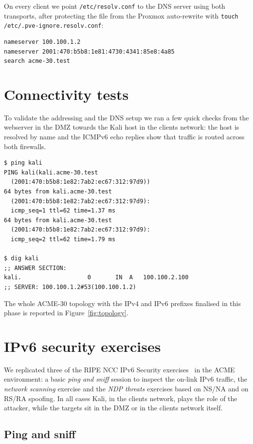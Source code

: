 \documentclass[twocolumn]{NobArticle}
\begin{document}
On every client we point \texttt{/etc/resolv.conf} to the DNS server using
both transports, after protecting the file from the Proxmox auto-rewrite
with \texttt{touch /etc/.pve-ignore.resolv.conf}:

\begin{lstlisting}
nameserver 100.100.1.2
nameserver 2001:470:b5b8:1e81:4730:4341:85e8:4a85
search acme-30.test
\end{lstlisting}

\section{Connectivity tests}

To validate the addressing and the DNS setup we ran a few quick checks from
the webserver in the DMZ towards the Kali host in the clients network: the
host is resolved by name and the ICMPv6 echo replies show that traffic is
routed across both firewalls.

\begin{lstlisting}
$ ping kali
PING kali(kali.acme-30.test
  (2001:470:b5b8:1e82:7ab2:ec67:312:97d9))
64 bytes from kali.acme-30.test
  (2001:470:b5b8:1e82:7ab2:ec67:312:97d9):
  icmp_seq=1 ttl=62 time=1.37 ms
64 bytes from kali.acme-30.test
  (2001:470:b5b8:1e82:7ab2:ec67:312:97d9):
  icmp_seq=2 ttl=62 time=1.79 ms

$ dig kali
;; ANSWER SECTION:
kali.                   0       IN  A   100.100.2.100
;; SERVER: 100.100.1.2#53(100.100.1.2)
\end{lstlisting}

The whole ACME-30 topology with the IPv4 and IPv6 prefixes finalised in this
phase is reported in Figure~\ref{fig:topology}.

\section{IPv6 security exercises}

We replicated three of the RIPE NCC IPv6 Security exercises~\cite{ripe} in
the ACME environment: a basic \textit{ping and sniff} session to inspect
the on-link IPv6 traffic, the \textit{network scanning} exercise and the
\textit{NDP threats} exercises based on NS/NA and on RS/RA spoofing. In all cases Kali, in the clients network,
plays the role of the attacker, while the targets sit in the DMZ or in the
clients network itself.

\subsection{Ping and sniff}
\end{document}
